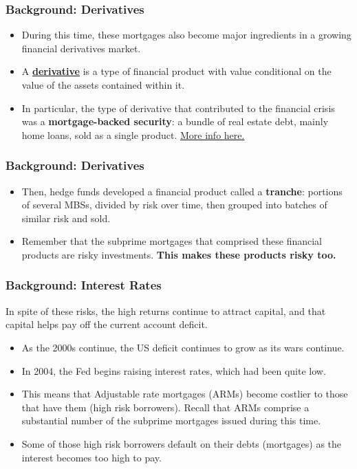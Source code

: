 \documentclass{beamer}
\begin{document}
\begin{frame} 
	\frametitle{\LARGE{Background: Derivatives}}
	\begin{itemize}
		\item During this time, these mortgages also become major ingredients in a growing financial derivatives market. \pause
		\item A \textbf{\href{https://www.thebalancemoney.com/role-of-derivatives-in-creating-mortgage-crisis-3970477}{derivative}} is a type of financial product with value conditional on the value of the assets contained within it. \pause
		\item In particular, the type of derivative that contributed to the financial crisis was a \textbf{mortgage-backed security}: a bundle of real estate debt, mainly home loans, sold as a single product. \href{https://www.investopedia.com/terms/m/mbs.asp}{More info here.}
	\end{itemize}
\end{frame}

\begin{frame} 
	\frametitle{\LARGE{Background: Derivatives}}
	\begin{itemize}
		\item Then, hedge funds developed a financial product called a \textbf{tranche}: portions of several MBSs, divided by risk over time, then grouped into batches of similar risk and sold. \pause
		\item Remember that the subprime mortgages that comprised these financial products are risky investments. \textbf{This makes these products risky too.}
	\end{itemize}
\end{frame}

\begin{frame} 
	\frametitle{\LARGE{Background: Interest Rates}}
	In spite of these risks, the high returns continue to attract capital, and that capital helps pay off the current account deficit.
	\begin{itemize}
		\item As the 2000s continue, the US deficit continues to grow as its wars continue. \pause
		\item In 2004, the Fed begins raising interest rates, which had been quite low. \pause
		\item This means that Adjustable rate mortgages (ARMs) become costlier to those that have them (high risk borrowers). Recall that ARMs comprise a substantial number of the subprime mortgages issued during this time. \pause
		\item Some of those high risk borrowers default on their debts (mortgages) as the interest becomes too high to pay. 
	\end{itemize}
\end{frame}
\end{document}
